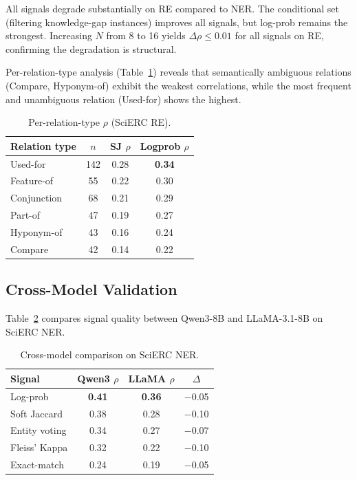 \documentclass[11pt,a4paper]{article}
\begin{document}
All signals degrade substantially on RE compared to NER. The conditional set (filtering knowledge-gap instances) improves all signals, but log-prob remains the strongest. Increasing $N$ from 8 to 16 yields $\Delta\rho\leq0.01$ for all signals on RE, confirming the degradation is structural.

Per-relation-type analysis (Table~\ref{tab:per_relation}) reveals that semantically ambiguous relations (Compare, Hyponym-of) exhibit the weakest correlations, while the most frequent and unambiguous relation (Used-for) shows the highest.

\begin{table}[t]
\centering
\small
\caption{Per-relation-type $\rho$ (SciERC RE).}
\label{tab:per_relation}
\begin{tabular}{lccc}
\toprule
Relation type & $n$ & SJ $\rho$ & Logprob $\rho$ \\
\midrule
Used-for     & 142 & 0.28 & \textbf{0.34} \\
Feature-of   &  55 & 0.22 & 0.30 \\
Conjunction  &  68 & 0.21 & 0.29 \\
Part-of      &  47 & 0.19 & 0.27 \\
Hyponym-of   &  43 & 0.16 & 0.24 \\
Compare      &  42 & 0.14 & 0.22 \\
\bottomrule
\end{tabular}
\end{table}

\subsection{Cross-Model Validation}

Table~\ref{tab:cross_model} compares signal quality between Qwen3-8B and LLaMA-3.1-8B on SciERC NER.

\begin{table}[t]
\centering
\small
\caption{Cross-model comparison on SciERC NER.}
\label{tab:cross_model}
\begin{tabular}{lccc}
\toprule
Signal & Qwen3 $\rho$ & LLaMA $\rho$ & $\Delta$ \\
\midrule
Log-prob      & \textbf{0.41} & \textbf{0.36} & $-$0.05 \\
Soft Jaccard  & 0.38 & 0.28 & $-$0.10 \\
Entity voting & 0.34 & 0.27 & $-$0.07 \\
Fleiss' Kappa & 0.32 & 0.22 & $-$0.10 \\
Exact-match   & 0.24 & 0.19 & $-$0.05 \\
\bottomrule
\end{tabular}
\end{table}
\end{document}
